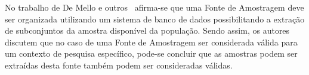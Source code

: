 
No trabalho de De Mello e outros~\cite{de2014towards} afirma-se que uma Fonte
de Amostragem deve ser organizada utilizando um sistema de banco de dados
possibilitando a extração de subconjuntos da amostra disponível da população.
Sendo assim, os autores discutem que no caso de uma Fonte de Amostragem ser
considerada válida para um contexto de pesquisa específico, pode-se concluir que
as amostras podem ser extraídas desta fonte também podem ser consideradas
válidas.



